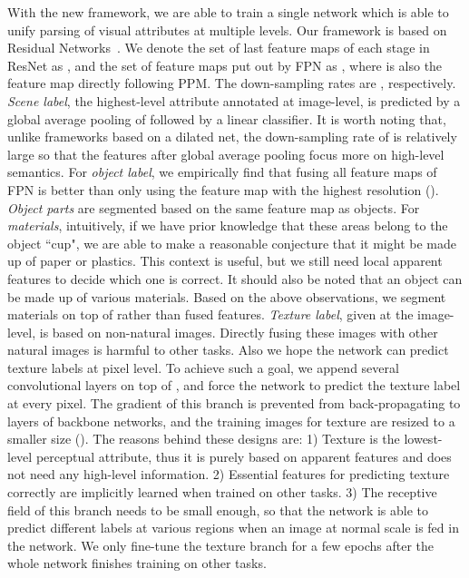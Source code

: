 \documentclass[runningheads]{llncs}
\begin{document}
With the new framework, we are able to train a single network which is able to unify parsing of visual attributes at multiple levels. Our framework is based on Residual Networks~\cite{he2016deep}. We denote the set of last feature maps of each stage in ResNet as , and the set of feature maps put out by FPN as , where  is also the feature map directly following PPM. The down-sampling rates are , respectively. \emph{Scene label}, the highest-level attribute annotated at image-level, is predicted by a global average pooling of  followed by a linear classifier. It is worth noting that, unlike frameworks based on a dilated net, the down-sampling rate of  is relatively large so that the features after global average pooling focus more on high-level semantics. For \emph{object label}, we empirically find that fusing all feature maps of FPN is better than only using the feature map with the highest resolution (). \emph{Object parts} are segmented based on the same feature map as objects. For \emph{materials}, intuitively, if we have prior knowledge that these areas belong to the object ``cup", we are able to make a reasonable conjecture that it might be made up of paper or plastics. This context is useful, but we still need local apparent features to decide which one is correct. It should also be noted that an object can be made up of various materials. Based on the above observations, we segment materials on top of  rather than fused features. \emph{Texture label}, given at the image-level, is based on non-natural images. Directly fusing these images with other natural images is harmful to other tasks. Also we hope the network can predict texture labels at pixel level. To achieve such a goal, we append several convolutional layers on top of , and force the network to predict the texture label at every pixel. The gradient of this branch is prevented from back-propagating to layers of backbone networks, and the training images for texture are resized to a smaller size (). The reasons behind these designs are: 1) Texture is the lowest-level perceptual attribute, thus it is purely based on apparent features and does not need any high-level information. 2) Essential features for predicting texture correctly are implicitly learned when trained on other tasks. 3) The receptive field of this branch needs to be small enough, so that the network is able to predict different labels at various regions when an image at normal scale is fed in the network. We only fine-tune the texture branch for a few epochs after the whole network finishes training on other tasks.
\end{document}
